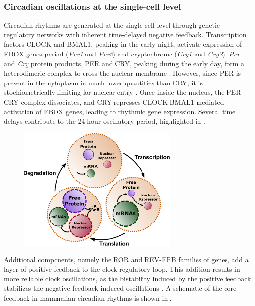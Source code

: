 \subsubsection{Circadian oscillations at the single-cell level}
Circadian rhythms are generated at the single-cell level through genetic regulatory networks with inherent time-delayed negative feedback. 
Transcription factors CLOCK and BMAL1, peaking in the early night, activate expression of EBOX genes period ({\itshape Per1} and {\itshape Per2}) and cryptochrome ({\itshape Cry1} and {\itshape Cry2}). 
{\itshape Per} and {\itshape Cry} protein products, PER and CRY, peaking during the early day, form a heterodimeric complex to cross the nuclear membrane \cite{Ko2006}. 
However, since PER is present in the cytoplasm in much lower quantities than CRY, it is stochiometrically-limiting for nuclear entry \cite{Lee2001}. 
Once inside the nucleus, the PER-CRY complex dissociates, and CRY represses CLOCK-BMAL1 mediated activation of EBOX genes, leading to rhythmic gene expression.
Several time delays contribute to the 24 hour oscillatory period, highlighted in .

\begin{figure}[tbp]
  \centering
  \includegraphics[width=0.7\textwidth]{chap1/figures/maindelays.pdf}
  \label{fig:maindelays}
\end{figure}

Additional components, namely the ROR and REV-ERB families of genes, add a layer of positive feedback to the clock regulatory loop.
This addition results in more reliable clock oscillations, as the bistability induced by the positive feedback stabilizes the negative-feedback induced oscillations \cite{Ananthasubramaniam2014a}.
A schematic of the core feedback in mammalian circadian rhythms is shown in .

